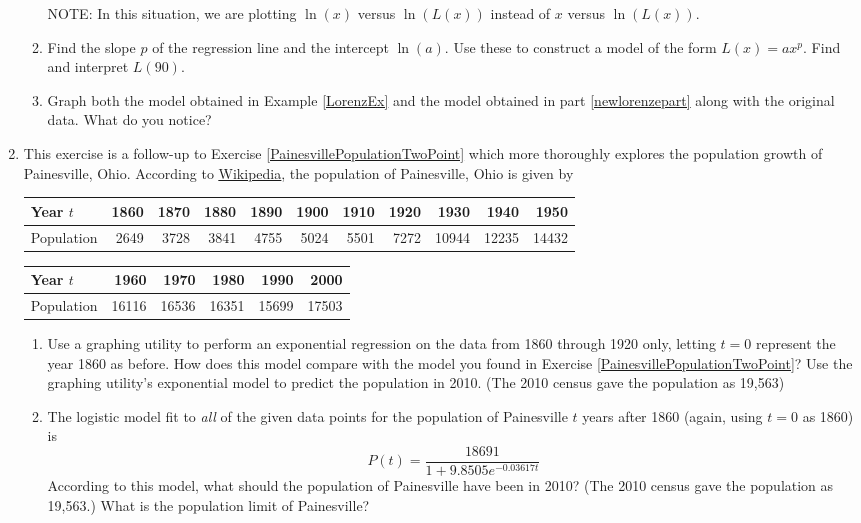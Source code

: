 \begin{enumerate}
\begin{enumerate}
NOTE:  In this situation, we are plotting $\ln(x)$ versus $\ln(L(x))$ instead of $x$ versus $\ln(L(x))$.  

\item  \label{newlorenzepart} Find the slope $p$ of the regression line and the intercept $\ln(a)$.  Use these to construct a model of the form $L(x) = a x^{p}$.   Find and interpret $L(90)$.

\item   Graph both the model obtained in Example \ref{LorenzEx} and the model obtained in part \ref{newlorenzepart} along with the original data.  What do you notice?

\end{enumerate}

\item  \label{PainesvillePopulationManyPoints} This exercise is a follow-up to Exercise \ref{PainesvillePopulationTwoPoint} which more thoroughly explores the population growth of Painesville, Ohio.  According to \href{http://en.wikipedia.org/wiki/Painesville}{\underline{Wikipedia}}, the population of Painesville, Ohio is given by


\noindent \begin{tabular}{|l|r|r|r|r|r|r|r|r|r|r|} \hline
Year $t$ & 1860 & 1870 & 1880 & 1890 & 1900 & 1910 & 1920 & 1930 & 1940 & 1950 \\ \hline 
Population& 2649 & 3728 & 3841 & 4755 & 5024 & 5501 & 7272 & 10944 & 12235 & 14432 \\ \hline
\end{tabular}

\noindent \begin{tabular}{|l|r|r|r|r|r|} \hline
Year $t$ & 1960 & 1970 & 1980 & 1990 & 2000 \\ \hline 
Population& 16116 & 16536 & 16351 & 15699 & 17503 \\ \hline
\end{tabular}

\begin{enumerate}

\item  Use a graphing utility to perform an exponential regression on the data from 1860 through 1920 only, letting $t = 0$ represent the year 1860 as before.  How does this model compare with the model you found in Exercise \ref{PainesvillePopulationTwoPoint}?   Use the graphing utility's exponential model to predict the population in 2010.   (The 2010 census gave the population as 19,563)

\item  The logistic model fit to \emph{all} of the given data points for the population of Painesville $t$ years after 1860 (again, using $t = 0$ as 1860) is \[ P(t) = \dfrac{18691}{1+9.8505e^{-0.03617t}} \] According to this model, what should the population of Painesville have been in 2010?  (The 2010 census gave the population as 19,563.) What is the population limit of Painesville?


\end{enumerate}
\end{enumerate}
